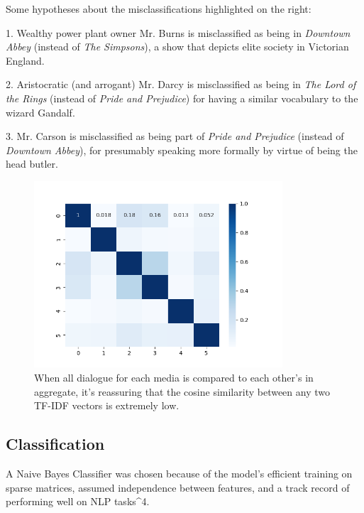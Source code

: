 \documentclass{article}
\newcommand{\largeimagewidth}{350}
\begin{document}
\begin{titlepage}
Some hypotheses about the misclassifications highlighted on the right:

1. Wealthy power plant owner Mr. Burns is misclassified as being in \textit{Downtown Abbey} (instead of \textit{The Simpsons}), a show that depicts elite society in Victorian England.

2. Aristocratic (and arrogant) Mr. Darcy is misclassified as being in \textit{The Lord of the Rings} (instead of \textit{Pride and Prejudice}) for having a similar vocabulary to the wizard Gandalf.

3. Mr. Carson is misclassified as being part of \textit{Pride and Prejudice} (instead of \textit{Downtown Abbey}), for presumably speaking more formally by virtue of being the head butler.

\begin{figure}[H]
\centering
\includegraphics[width=\largeimagewidth]{images/tfidf_across_document_heatmap.png}
\caption{When all dialogue for each media is compared to each other's in aggregate, it's reassuring that the cosine similarity between any two TF-IDF vectors is extremely low.}
\end{figure}

\subsection{Classification}

A Naive Bayes Classifier was chosen because of the model's efficient training on sparse matrices, assumed independence between features, and a track record of performing well on NLP tasks^4.


\end{titlepage}
\end{document}
